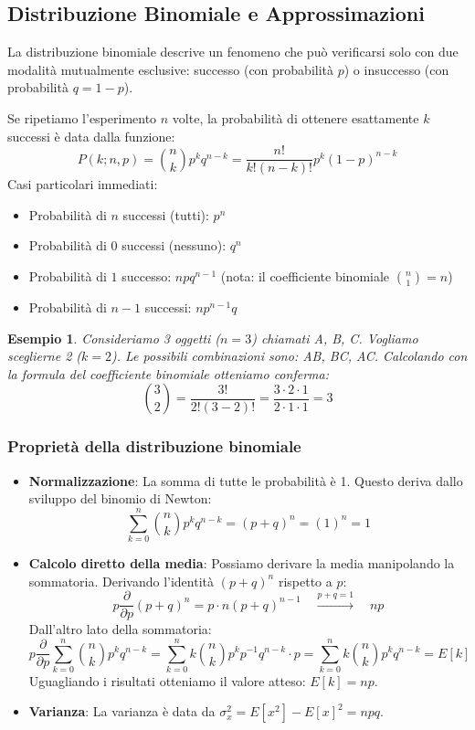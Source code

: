 \documentclass[openany,a4paper,12pt]{book}
\newtheorem*{example}{Esempio}
\theoremstyle{remark}
\begin{document}
\subsection{Distribuzione Binomiale e Approssimazioni}
\vspace{0.4 cm}

La distribuzione binomiale descrive un fenomeno che può verificarsi solo con due modalità mutualmente esclusive: successo (con probabilità $p$) o insuccesso (con probabilità $q=1-p$).

Se ripetiamo l'esperimento $n$ volte, la probabilità di ottenere esattamente $k$ successi è data dalla funzione:
\[
P(k;n,p) = \binom{n}{k}p^k q^{n-k} = \frac{n!}{k!(n-k)!}p^k (1-p)^{n-k}
\]
Casi particolari immediati:
\begin{itemize}[itemsep=0.1em]
 \item Probabilità di $n$ successi (tutti): $p^n$ 
 \item Probabilità di $0$ successi (nessuno): $q^n$  
 \item Probabilità di $1$ successo: $n p q^{n-1}$ (nota: il coefficiente binomiale $\binom{n}{1}=n$)
 \item Probabilità di $n-1$ successi: $n p^{n-1}q$
\end{itemize}

\begin{example}
    Consideriamo 3 oggetti ($n=3$) chiamati A, B, C. Vogliamo sceglierne 2 ($k=2$). 
    Le possibili combinazioni sono: AB, BC, AC.
    Calcolando con la formula del coefficiente binomiale otteniamo conferma:
    \[
    \binom{3}{2} = \frac{3!}{2!(3-2)!} = \frac{3 \cdot 2 \cdot 1}{2 \cdot 1 \cdot 1} = 3
    \]
\end{example}

\subsubsection*{Proprietà della distribuzione binomiale}
\begin{itemize}
    \item \textbf{Normalizzazione}: La somma di tutte le probabilità è 1. Questo deriva dallo sviluppo del binomio di Newton:
    \[ \sum_{k=0}^{n} \binom {n}{k}p^kq^{n-k} = (p+q)^n = (1)^n = 1 \]
    
    \item \textbf{Calcolo diretto della media}: Possiamo derivare la media manipolando la sommatoria. Derivando l'identità $(p+q)^n$ rispetto a $p$:
    \[
    p \frac{\partial}{\partial p} (p + q)^n = p \cdot n(p+q)^{n-1} \quad \xrightarrow{p+q=1} \quad np
    \]
    Dall'altro lato della sommatoria:
    \[
    p \frac{\partial}{\partial p} \sum_{k=0}^{n} \binom{n}{k} p^k q^{n-k} = \sum_{k=0}^{n} k \binom{n}{k} p^k p^{-1} q^{n-k} \cdot p = \sum_{k=0}^{n} k \binom{n}{k} p^k q^{n-k} = E[k]
    \]
    Uguagliando i risultati otteniamo il valore atteso: $E[k] = np$.
    
    \item \textbf{Varianza}: La varianza è data da $\sigma_x^2 = E[x^2] - E[x]^2 = npq$.
\end{itemize}
\end{document}
